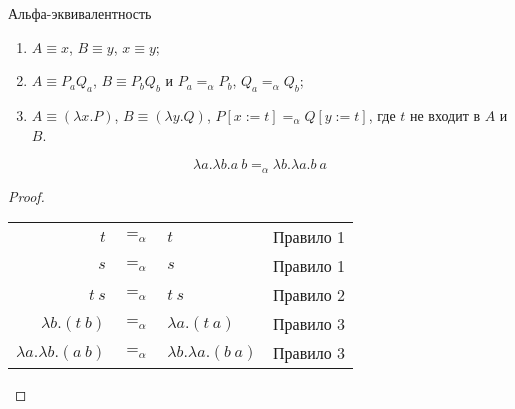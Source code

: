 \documentclass[aspectratio=169]{beamer}
\begin{document}
\begin{frame}{Альфа-эквивалентность}
\begin{enumerate}
\item $A \equiv x$, $B \equiv y$, $x \equiv y$;
\item $A \equiv P_a Q_a$, $B \equiv P_b Q_b$ и $P_a =_\alpha P_b$, $Q_a =_\alpha Q_b$;
\item $A \equiv (\lambda x.P)$, $B \equiv (\lambda y.Q)$, $P[x := t] =_\alpha Q[y := t]$, где $t$ не входит в $A$ и $B$.
\end{enumerate}\vspace{-0.2cm}\begin{lmm}\vspace{-0.3cm}
$$\lambda a.\lambda b.a\ b =_\alpha \lambda b.\lambda a.b\ a$$\vspace{-0.3cm}
\end{lmm}\vspace{-0.3cm}
\begin{proof}
\begin{center}\begin{tabular}{rcll}
  $t$ & $=_\alpha$ &$t$& Правило 1\\
  $s$ & $=_\alpha$ &$s$& Правило 1\\
  $t\ s$ & $=_\alpha$ &$t\ s$& Правило 2\\
  $\lambda b.(t\ b)$ & $=_\alpha$ &$\lambda a.(t\ a)$ & Правило 3\\
  $\lambda a.\lambda b.(a\ b)$ & $=_\alpha$ &$\lambda b.\lambda a.(b\ a)$ & Правило 3\\
\end{tabular}\end{center}\vspace{-0.3cm}
\end{proof}
\end{frame}
\end{document}
